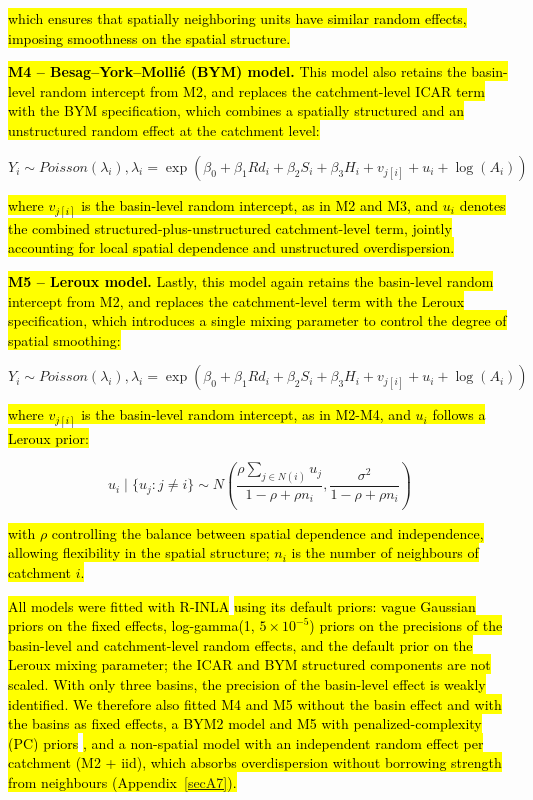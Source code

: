 \documentclass[journal abbreviation, manuscript]{copernicus}
\newcommand{\hlE}[1]{{\sethlcolor{edcyan}\hl{#1}}}
\begin{document}
\hl{which ensures that spatially neighboring units have similar random effects, imposing smoothness on the spatial structure.}

\hl{\textbf{M4 -- Besag--York--Molli\'{e} (BYM) model.} This model also retains the basin-level random intercept from M2, and replaces the catchment-level ICAR term with the BYM specification, which combines a spatially structured and an unstructured random effect at the catchment level:}

\begin{equation}
Y_i \sim Poisson(\lambda_i), \lambda_i = \exp(\beta_0 + \beta_1 Rd_i + \beta_2 S_i + \beta_3 H_i + v_{j[i]} + u_i + \log(A_i))
\end{equation}

\hl{where $v_{j[i]}$ is the basin-level random intercept, as in M2 and M3, and $u_i$ denotes the combined structured-plus-unstructured catchment-level term, jointly accounting for local spatial dependence and unstructured overdispersion.}

\hl{\textbf{M5 -- Leroux model.} Lastly, this model again retains the basin-level random intercept from M2, and replaces the catchment-level term with the Leroux specification, which introduces a single mixing parameter to control the degree of spatial smoothing:}

\begin{equation}
Y_i \sim Poisson(\lambda_i), \lambda_i = \exp(\beta_0 + \beta_1 Rd_i + \beta_2 S_i + \beta_3 H_i + v_{j[i]} + u_i + \log(A_i))
\end{equation}

\hl{where $v_{j[i]}$ is the basin-level random intercept, as in M2-M4, and $u_i$ follows a Leroux prior:}

\begin{equation}
u_i \mid \{u_j : j \neq i\} \sim N \left( \frac{\rho \sum_{j \in N(i)} u_j}{1 - \rho + \rho n_i}, \frac{\sigma^2}{1 - \rho + \rho n_i} \right)
\end{equation}

\hl{with $\rho$ controlling the balance between spatial dependence and independence, allowing flexibility in the spatial structure}\hlE{; $n_i$ is the number of neighbours of catchment $i$.}

\hlE{All models were fitted with R-INLA }\citep{rue2009approximate}\hlE{ using its default priors: vague Gaussian priors on the fixed effects, log-gamma(1, $5 \times 10^{-5}$) priors on the precisions of the basin-level and catchment-level random effects, and the default prior on the Leroux mixing parameter; the ICAR and BYM structured components are not scaled. With only three basins, the precision of the basin-level effect is weakly identified. We therefore also fitted M4 and M5 without the basin effect and with the basins as fixed effects, a BYM2 model and M5 with penalized-complexity (PC) priors }\citep{simpson2017penalising}\hlE{, and a non-spatial model with an independent random effect per catchment (M2 + iid), which absorbs overdispersion without borrowing strength from neighbours (\mbox{Appendix~\ref{secA7}}).}
\end{document}
